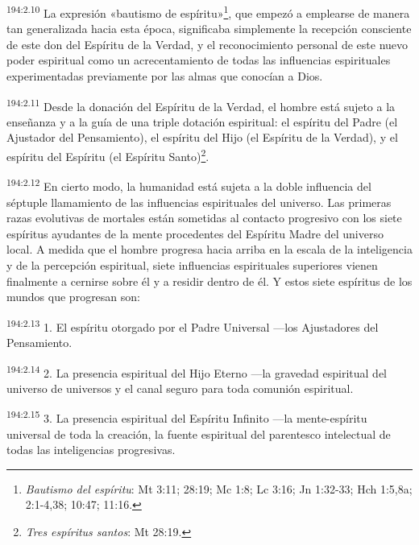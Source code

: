 \par 
\textsuperscript{194:2.10} La expresión «bautismo de espíritu»\footnote{\textit{Bautismo del espíritu}: Mt 3:11; 28:19; Mc 1:8; Lc 3:16; Jn 1:32-33; Hch 1:5,8a; 2:1-4,38; 10:47; 11:16.}, que empezó a emplearse de manera tan generalizada hacia esta época, significaba simplemente la recepción consciente de este don del Espíritu de la Verdad, y el reconocimiento personal de este nuevo poder espiritual como un acrecentamiento de todas las influencias espirituales experimentadas previamente por las almas que conocían a Dios.

\par 
\textsuperscript{194:2.11} Desde la donación del Espíritu de la Verdad, el hombre está sujeto a la enseñanza y a la guía de una triple dotación espiritual: el espíritu del Padre (el Ajustador del Pensamiento), el espíritu del Hijo (el Espíritu de la Verdad), y el espíritu del Espíritu (el Espíritu Santo)\footnote{\textit{Tres espíritus santos}: Mt 28:19.}.

\par 
\textsuperscript{194:2.12} En cierto modo, la humanidad está sujeta a la doble influencia del séptuple llamamiento de las influencias espirituales del universo. Las primeras razas evolutivas de mortales están sometidas al contacto progresivo con los siete espíritus ayudantes de la mente procedentes del Espíritu Madre del universo local. A medida que el hombre progresa hacia arriba en la escala de la inteligencia y de la percepción espiritual, siete influencias espirituales superiores vienen finalmente a cernirse sobre él y a residir dentro de él. Y estos siete espíritus de los mundos que progresan son:

\par 
\textsuperscript{194:2.13} 1. El espíritu otorgado por el Padre Universal ---los Ajustadores del Pensamiento.

\par 
\textsuperscript{194:2.14} 2. La presencia espiritual del Hijo Eterno ---la gravedad espiritual del universo de universos y el canal seguro para toda comunión espiritual.

\par 
\textsuperscript{194:2.15} 3. La presencia espiritual del Espíritu Infinito ---la mente-espíritu universal de toda la creación, la fuente espiritual del parentesco intelectual de todas las inteligencias progresivas.

